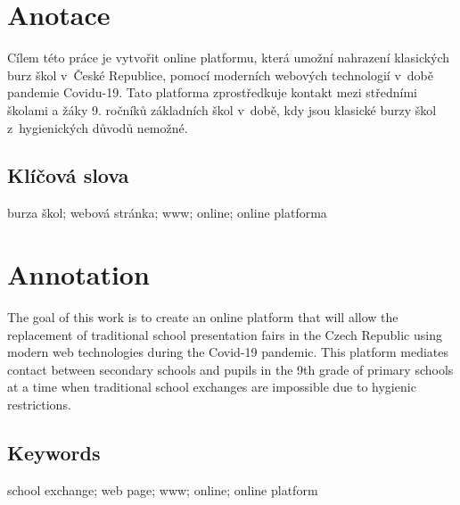 \documentclass{template/socthesis}
\author{Vít Falta}
\begin{document}
\sloppy

	\maketitle
	
	
	
	\pagestyle{empty}
	
	\section*{Anotace}
	Cílem této práce je vytvořit online platformu, která umožní nahrazení klasických burz škol v~České Republice, pomocí moderních webových technologií v~době pandemie Covidu-19. Tato platforma zprostředkuje kontakt mezi středními školami a žáky 9. ročníků základních škol v~době, kdy jsou klasické burzy škol z~hygienických důvodů nemožné.
	
	\subsection*{Klíčová slova}
	burza škol; webová stránka; www; online; online platforma
	
	\vspace{20mm}
	
	\section*{Annotation}
	The goal of this work is to create an online platform that will allow the replacement of traditional school presentation fairs in the Czech Republic using modern web technologies during the Covid-19 pandemic. This platform mediates contact between secondary schools and pupils in the 9th grade of primary schools at a time when traditional school exchanges are impossible due to hygienic restrictions.

	\subsection*{Keywords}
	school exchange; web page; www; online; online platform
	
\end{document}
